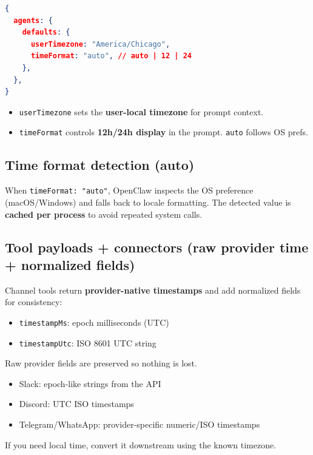 \begin{lstlisting}[language=json]
{
  agents: {
    defaults: {
      userTimezone: "America/Chicago",
      timeFormat: "auto", // auto | 12 | 24
    },
  },
}
\end{lstlisting}


\begin{itemize}
  \item \texttt{userTimezone} sets the \textbf{user-local timezone} for prompt context.
  \item \texttt{timeFormat} controls \textbf{12h/24h display} in the prompt. \texttt{auto} follows OS prefs.
\end{itemize}


\subsection{Time format detection (auto)}


When \texttt{timeFormat: "auto"}, OpenClaw inspects the OS preference (macOS/Windows)
and falls back to locale formatting. The detected value is \textbf{cached per process}
to avoid repeated system calls.

\subsection{Tool payloads + connectors (raw provider time + normalized fields)}


Channel tools return \textbf{provider-native timestamps} and add normalized fields for consistency:

\begin{itemize}
  \item \texttt{timestampMs}: epoch milliseconds (UTC)
  \item \texttt{timestampUtc}: ISO 8601 UTC string
\end{itemize}


Raw provider fields are preserved so nothing is lost.

\begin{itemize}
  \item Slack: epoch-like strings from the API
  \item Discord: UTC ISO timestamps
  \item Telegram/WhatsApp: provider-specific numeric/ISO timestamps
\end{itemize}


If you need local time, convert it downstream using the known timezone.

